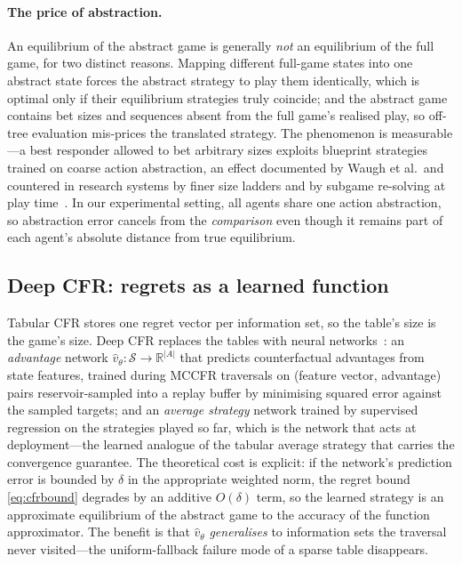 \paragraph{The price of abstraction.} An equilibrium of the abstract game is generally \emph{not} an equilibrium of the full game, for two distinct reasons. Mapping different full-game states into one abstract state forces the abstract strategy to play them identically, which is optimal only if their equilibrium strategies truly coincide; and the abstract game contains bet sizes and sequences absent from the full game's realised play, so off-tree evaluation mis-prices the translated strategy. The phenomenon is measurable---a best responder allowed to bet arbitrary sizes exploits blueprint strategies trained on coarse action abstraction, an effect documented by Waugh et al.~and countered in research systems by finer size ladders and by subgame re-solving at play time~\cite{waugh2009abstraction,brown2018depth}. In our experimental setting, all agents share one action abstraction, so abstraction error cancels from the \emph{comparison} even though it remains part of each agent's absolute distance from true equilibrium.

\subsection{Deep CFR: regrets as a learned function}\label{sec:deepcfr}

Tabular CFR stores one regret vector per information set, so the table's size is the game's size. Deep CFR replaces the tables with neural networks~\cite{brown2019deep}: an \emph{advantage} network $\hat v_{\theta}: \mathcal{S} \to \mathbb{R}^{|A|}$ that predicts counterfactual advantages from state features, trained during MCCFR traversals on (feature vector, advantage) pairs reservoir-sampled into a replay buffer by minimising squared error against the sampled targets; and an \emph{average strategy} network trained by supervised regression on the strategies played so far, which is the network that acts at deployment---the learned analogue of the tabular average strategy that carries the convergence guarantee. The theoretical cost is explicit: if the network's prediction error is bounded by $\delta$ in the appropriate weighted norm, the regret bound \eqref{eq:cfrbound} degrades by an additive $O(\delta)$ term, so the learned strategy is an approximate equilibrium of the abstract game to the accuracy of the function approximator. The benefit is that $\hat v_\theta$ \emph{generalises} to information sets the traversal never visited---the uniform-fallback failure mode of a sparse table disappears.

